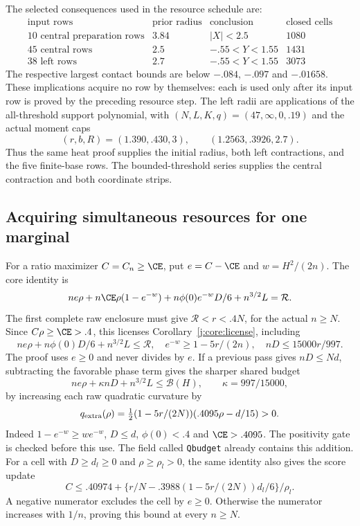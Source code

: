 The selected consequences used in the resource schedule are:
\[
\begin{array}{l|c|c|r}
\text{input rows}&\text{prior radius}&\text{conclusion}&\text{closed cells}\\\hline
10\text{ central preparation rows}&3.84&|X|<2.5&1080\\
45\text{ central rows}&2.5&-.55<Y<1.55&1431\\
38\text{ left rows}&2.7&-.55<Y<1.55&3073
\end{array}
\]
The respective largest contact bounds are below $-.084$, $-.097$ and
$-.01658$. These implications acquire no row by themselves: each is
used only after its input row is proved by the preceding resource step.
The left radii are applications of the all-threshold support polynomial,
with $(N,L,K,q)=(47,\infty,0,.19)$ and the actual moment caps
\[
 (r,b,R)=(1.390,.430,3),\qquad (1.2563,.3926,2.7).
\]
Thus the same heat proof supplies the initial radius, both left
contractions, and the five finite-base rows. The bounded-threshold
series supplies the central contraction and both coordinate strips.




\subsection{Acquiring simultaneous resources for one marginal}\label{j:local:sign}
For a ratio maximizer $C=C_n\ge\CE$, put $e=C-\CE$ and $w=H^2/(2n)$.
The core identity is
\[
 ne\rho+n\CE\rho(1-e^{-w})+n\phi(0)e^{-w}D/6+n^{3/2}L=\mathcal R.
\]
The first complete raw enclosure must give $\mathcal R<r<.4N$, for the
actual $n\ge N$. Since $C\rho\ge\CE>.4$, this licenses
Corollary~\ref{j:core:license}, including
\[
 ne\rho+n\phi(0)D/6+n^{3/2}L\le\mathcal R,\quad
 e^{-w}\ge1-5r/(2n),\quad nD\le15000r/997.
\]
The proof uses $e\ge0$ and never divides by $e$.
If a previous pass gives $nD\le Nd$, subtracting the favorable phase
term gives the sharper shared budget
\begin{equation}\label{j:local:budget}
 ne\rho+\kappa nD+n^{3/2}L\le\mathcal B(H),\qquad\kappa=997/15000,
\end{equation}
by increasing each raw quadratic curvature by
\begin{equation}\label{j:local:re:extra}
 q_{\rm extra}(\rho)=\tfrac12(1-5r/(2N))(.4095\rho-d/15)>0.
\end{equation}
Indeed $1-e^{-w}\ge we^{-w}$, $D\le d$, $\phi(0)<.4$ and
$\CE>.4095$. The positivity gate is checked before this use.
The field called \texttt{Qbudget} already contains this addition.
For a cell with $D\ge d_l\ge0$ and $\rho\ge\rho_l>0$, the same identity
also gives the score update
\[
 C\le .40974+\{r/N-.3988(1-5r/(2N))d_l/6\}/\rho_l.
\]
A negative numerator excludes the cell by $e\ge0$. Otherwise the numerator
increases with $1/n$, proving this bound at every $n\ge N$.


